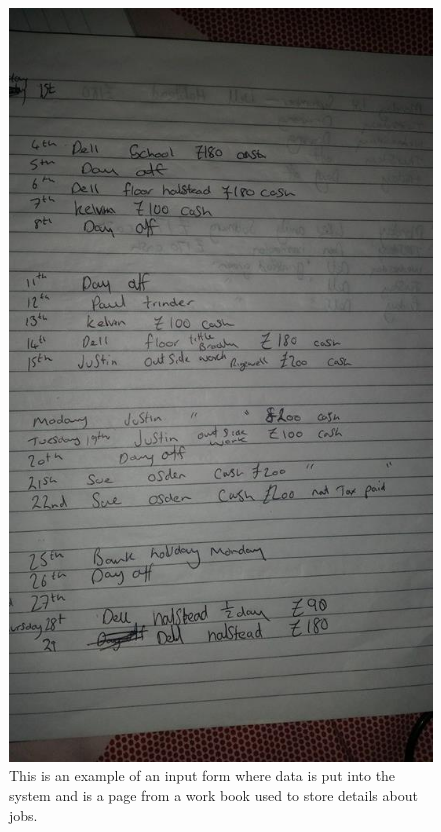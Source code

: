 \begin{figure}[H]
    \includegraphics[width=\textwidth]{./Analysis/images/workbookPage.jpg}
    \caption{This is an example of an input form where data is put into the system and is a page from a work book used to store details about jobs.} \label{fig:work_book_page}
\end{figure}

